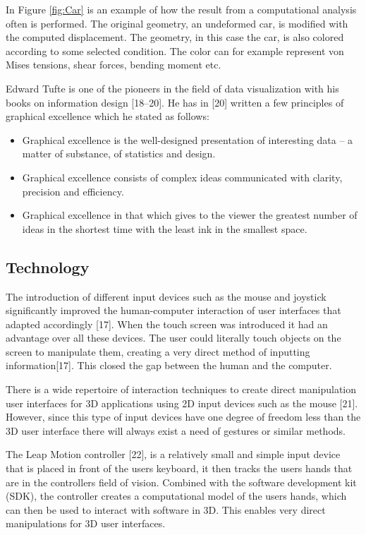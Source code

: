In Figure \ref{fig:Car} is an example of how the result from a computational analysis often is performed. The original geometry, an undeformed car, is modified with the computed displacement. The geometry, in this case the car, is also colored according to some selected condition. The color can for example represent von Mises tensions, shear forces, bending moment etc. 

Edward Tufte is one of the pioneers in the field of data visualization with his books on information design [18–20]. He has in [20] written a few principles of graphical excellence which he stated as follows:

\begin{itemize} 
\item Graphical excellence is the well-designed presentation of interesting data – a matter of substance, of statistics and design.
\item Graphical excellence consists of complex ideas communicated with clarity, precision and efficiency.
\item Graphical excellence in that which gives to the viewer the greatest number of ideas in the shortest time with the least ink in the smallest space.
\end{itemize} 

\subsection{Technology}
The introduction of different input devices such as the mouse and joystick significantly improved the human-computer interaction of user interfaces that adapted accordingly [17]. When the touch screen was introduced it had an advantage over all these devices. The user could literally touch objects on the screen to manipulate them, creating a very direct method of inputting information[17]. This closed the gap between the human and the computer.

There is a wide repertoire of interaction techniques to create direct manipulation user interfaces for 3D applications using 2D input devices such as the mouse [21]. However, since this type of input devices have one degree of freedom less than the 3D user interface there will always exist a need of gestures or similar methods. 

The Leap Motion controller [22], is a relatively small and simple input device that is placed in front of the users keyboard, it then tracks the users hands that are in the controllers field of vision. Combined with the software development kit (SDK), the controller creates a computational model of the users hands, which can then be used to interact with software in 3D. This enables very direct manipulations for 3D user interfaces.

